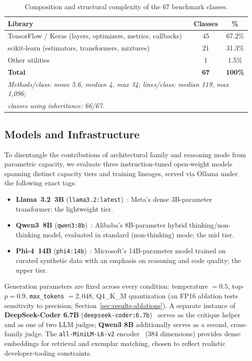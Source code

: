 \documentclass[pdflatex,sn-mathphys-ay]{sn-jnl}%
\theoremstyle{thmstyleone}%
\theoremstyle{thmstyletwo}%
\theoremstyle{thmstylethree}%
\begin{document}
\begin{table}[h]
\centering
\small
\caption{Composition and structural complexity of the 67 benchmark classes.}
\label{tab:dataset-stats}
\begin{tabular}{lcc}
\toprule
\textbf{Library} & \textbf{Classes} & \textbf{\%} \\
\midrule
TensorFlow / Keras (layers, optimizers, metrics, callbacks) & 45 & 67.2\% \\
scikit-learn (estimators, transformers, mixtures) & 21 & 31.3\% \\
Other utilities & 1 & 1.5\% \\
\midrule
\textbf{Total} & \textbf{67} & \textbf{100\%} \\
\midrule
\multicolumn{3}{l}{\textit{Methods/class: mean 5.6, median 4, max 34; lines/class: median 119, max 1,096;}} \\
\multicolumn{3}{l}{\textit{classes using inheritance: 66/67.}} \\
\bottomrule
\end{tabular}
\end{table}

\subsection{Models and Infrastructure}
\label{sec:models-hardware}
To disentangle the contributions of architectural family and reasoning mode from parametric capacity, we evaluate three instruction-tuned open-weight models spanning distinct capacity tiers and training lineages, served via Ollama under the following exact tags:
\begin{itemize}
    \item \textbf{Llama~3.2~3B} (\texttt{llama3.2:latest})~\citep{grattafiori2024llama3herdmodels}: Meta's dense 3B-parameter transformer; the lightweight tier.
    \item \textbf{Qwen3~8B} (\texttt{qwen3:8b})~\citep{yang2025qwen3technicalreport}: Alibaba's 8B-parameter hybrid thinking/non-thinking model, evaluated in standard (non-thinking) mode; the mid tier.
    \item \textbf{Phi-4~14B} (\texttt{phi4:14b})~\citep{abdin2024phi4technicalreport}: Microsoft's 14B-parameter model trained on curated synthetic data with an emphasis on reasoning and code quality; the upper tier.
\end{itemize}
Generation parameters are fixed across every condition: temperature $=0.5$, top-$p=0.9$, \texttt{max\_tokens} $=2{,}048$, Q4\_K\_M quantization (an FP16 ablation tests sensitivity to precision; Section~\ref{sec:results-ablations}). A separate instance of \textbf{DeepSeek-Coder 6.7B} (\texttt{deepseek-coder:6.7b})~\citep{deepseekcoderv2} serves as the critique helper and as one of two LLM judges; \textbf{Qwen3 8B} additionally serves as a second, cross-family judge. The \texttt{all-MiniLM-L6-v2} encoder~\citep{reimers-gurevych-2019-sentence} (384 dimensions) provides dense embeddings for retrieval and exemplar matching, chosen to reflect realistic developer-tooling constraints.
\end{document}
